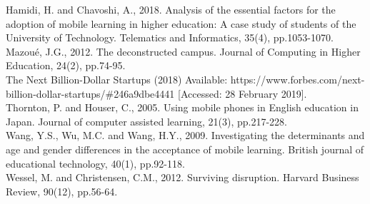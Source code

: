 \documentclass[11]{article}
\begin{document}
Hamidi, H. and Chavoshi, A., 2018. Analysis of the essential factors for the adoption of mobile learning in higher education: A case study of students of the University of Technology. Telematics and Informatics, 35(4), pp.1053-1070.\\

Mazoué, J.G., 2012. The deconstructed campus. Journal of Computing in Higher Education, 24(2), pp.74-95.\\

The Next Billion-Dollar Startups (2018) Available: https://www.forbes.com/next-billion-dollar-startups/\#246a9dbe4441 [Accessed: 28 February 2019].\\

Thornton, P. and Houser, C., 2005. Using mobile phones in English education in Japan. Journal of computer assisted learning, 21(3), pp.217-228.\\

Wang, Y.S., Wu, M.C. and Wang, H.Y., 2009. Investigating the determinants and age and gender differences in the acceptance of mobile learning. British journal of educational technology, 40(1), pp.92-118.\\

Wessel, M. and Christensen, C.M., 2012. Surviving disruption. Harvard Business Review, 90(12), pp.56-64.\\
\end{document}
